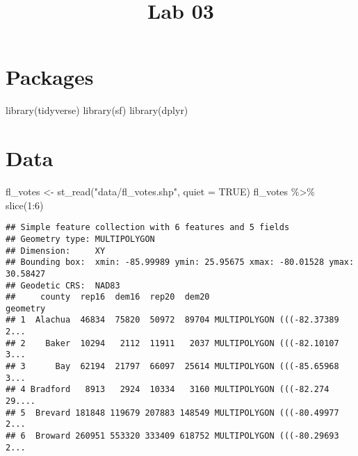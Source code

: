 \documentclass[
]{article}
\title{Lab 03}
\author{}
\date{\vspace{-2.5em}}
\newenvironment{Shaded}{\begin{snugshade}}{\end{snugshade}}
\newcommand{\AttributeTok}[1]{\textcolor[rgb]{0.77,0.63,0.00}{#1}}
\newcommand{\ConstantTok}[1]{\textcolor[rgb]{0.00,0.00,0.00}{#1}}
\newcommand{\DecValTok}[1]{\textcolor[rgb]{0.00,0.00,0.81}{#1}}
\newcommand{\FunctionTok}[1]{\textcolor[rgb]{0.00,0.00,0.00}{#1}}
\newcommand{\NormalTok}[1]{#1}
\newcommand{\OtherTok}[1]{\textcolor[rgb]{0.56,0.35,0.01}{#1}}
\newcommand{\SpecialCharTok}[1]{\textcolor[rgb]{0.00,0.00,0.00}{#1}}
\newcommand{\StringTok}[1]{\textcolor[rgb]{0.31,0.60,0.02}{#1}}
\begin{document}
\maketitle

\hypertarget{packages}{%
\section{Packages}\label{packages}}

\begin{Shaded}
\begin{Highlighting}[]
\FunctionTok{library}\NormalTok{(tidyverse)}
\FunctionTok{library}\NormalTok{(sf)}
\FunctionTok{library}\NormalTok{(dplyr)}
\end{Highlighting}
\end{Shaded}

\hypertarget{data}{%
\section{Data}\label{data}}

\begin{Shaded}
\begin{Highlighting}[]
\NormalTok{fl\_votes }\OtherTok{\textless{}{-}} \FunctionTok{st\_read}\NormalTok{(}\StringTok{"data/fl\_votes.shp"}\NormalTok{, }\AttributeTok{quiet =} \ConstantTok{TRUE}\NormalTok{)}
\NormalTok{fl\_votes }\SpecialCharTok{\%\textgreater{}\%}
  \FunctionTok{slice}\NormalTok{(}\DecValTok{1}\SpecialCharTok{:}\DecValTok{6}\NormalTok{)}
\end{Highlighting}
\end{Shaded}

\begin{verbatim}
## Simple feature collection with 6 features and 5 fields
## Geometry type: MULTIPOLYGON
## Dimension:     XY
## Bounding box:  xmin: -85.99989 ymin: 25.95675 xmax: -80.01528 ymax: 30.58427
## Geodetic CRS:  NAD83
##     county  rep16  dem16  rep20  dem20                       geometry
## 1  Alachua  46834  75820  50972  89704 MULTIPOLYGON (((-82.37389 2...
## 2    Baker  10294   2112  11911   2037 MULTIPOLYGON (((-82.10107 3...
## 3      Bay  62194  21797  66097  25614 MULTIPOLYGON (((-85.65968 3...
## 4 Bradford   8913   2924  10334   3160 MULTIPOLYGON (((-82.274 29....
## 5  Brevard 181848 119679 207883 148549 MULTIPOLYGON (((-80.49977 2...
## 6  Broward 260951 553320 333409 618752 MULTIPOLYGON (((-80.29693 2...
\end{verbatim}
\end{document}
